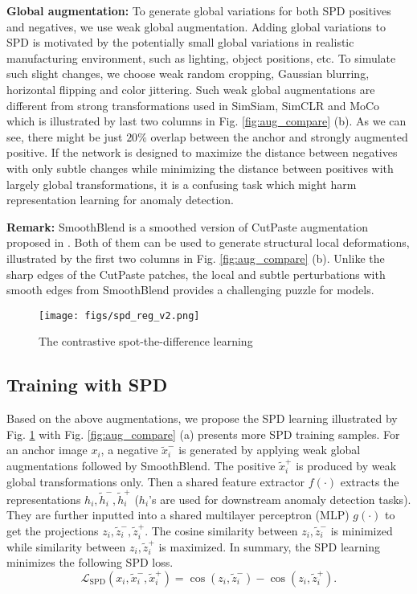 \documentclass[runningheads]{llncs}
\begin{document}
\noindent\textbf{Global augmentation:} To generate global variations for both SPD positives and negatives, we use weak global augmentation. Adding global variations to SPD is motivated by the potentially small global variations in realistic manufacturing environment, such as lighting, object positions, etc. To simulate such slight changes, we choose weak random cropping, Gaussian blurring, horizontal flipping and color jittering. Such weak global augmentations are different from strong transformations used in SimSiam, SimCLR and MoCo which is illustrated by last two columns in Fig. \ref{fig:aug_compare} (b). As we can see, there might be just $20\%$ overlap between the anchor and strongly augmented positive. If the network is designed to maximize the distance between negatives with only subtle changes while minimizing the distance between positives with largely global transformations, it is a confusing task which might harm representation learning for anomaly detection.

\noindent\textbf{Remark:} SmoothBlend is a smoothed version of CutPaste augmentation proposed in \cite{li2021cutpaste}. Both of them can be used to generate structural local deformations, illustrated by the first two columns in Fig. \ref{fig:aug_compare} (b). Unlike the sharp edges of the CutPaste patches, the local and subtle perturbations with smooth edges from SmoothBlend provides a challenging puzzle for models. 
\begin{figure}[!t]
 \centering
\texttt{[image: figs/spd\_reg\_v2.png]}
\caption{The contrastive spot-the-difference learning}
\label{fig:spd_reg}
\end{figure}
\subsection{Training with SPD}
Based on the above augmentations, we propose the SPD learning illustrated by Fig. \ref{fig:spd_reg} with Fig. \ref{fig:aug_compare} (a) presents more SPD training samples. For an anchor image $x_i$, a negative $\tilde{x}_i^-$ is generated by applying weak global augmentations followed by SmoothBlend. The positive $\tilde{x}_i^+$  is produced by weak global transformations only. Then a shared feature extractor $f(\cdot)$ extracts the representations $h_i, \tilde{h}_i^-, \tilde{h}_i^+$ ($h_i$'s are used for downstream anomaly detection tasks). They are further inputted into a shared multilayer perceptron (MLP) $g(\cdot)$ to get the projections $z_i, \tilde{z}_i^-,\tilde{z}_i^+$. The cosine similarity between $z_i, \tilde{z}_i^-$ is minimized while similarity between $z_i, \tilde{z}_i^+$ is maximized. In summary, the SPD learning minimizes the following SPD loss. 
\begin{equation}
    \mathcal{L}_{\mathrm{SPD}}(x_i,\tilde{x}_i^-,\tilde{x}_i^+)=
\cos(z_i, \tilde{z}_i^-)-\cos(z_i, \tilde{z}_i^+).
    \label{eqn:l_spd}
\end{equation}
\end{document}
